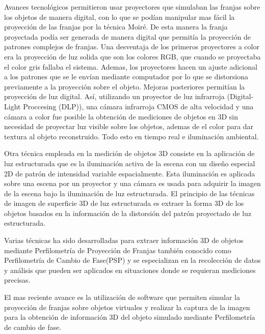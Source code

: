 \documentclass[10pt,letterpaper]{article}
\begin{document}
Avances tecnológicos permitieron usar proyectores que simulaban las franjas sobre los objetos de manera digital, con lo que se podían manipular mas fácil la proyección de las franjas por la técnica Moiré. De esta manera la franja proyectada podía ser generada de manera digital que permitía la proyección de patrones complejos de franjas. Una  desventaja de los primeros proyectores a color era la proyección de luz solida que son los colores RGB, que cuando se proyectaba el color gris fallaba el sistema. Ademas, los proyectores hacen un ajuste adicional a los patrones que se le envían mediante computador por lo que se distorsiona previamente a la proyección sobre el objeto. Mejoras posteriores permitían la proyección de luz digital. Así, utilizando un proyector de luz infrarroja (Digital-Light Proccesing (DLP)), una cámara infrarroja CMOS de alta velocidad y una cámara a color fue posible la obtención de mediciones de objetos en 3D sin necesidad de proyectar luz visible sobre los objetos, ademas de el color para dar textura al objeto reconstruido. Todo esto en tiempo real e iluminación ambiental\cite{Ou:Li}. %

Otra técnica empleada en la medición de objetos 3D consiste en la aplicación de luz estructurada que es la iluminación activa de la escena con un diseño especial 2D de patrón de intensidad variable espacialmente. Esta iluminación es aplicada sobre una escena por un proyector y una cámara es usada para adquirir la imagen de la escena bajo la iluminación de luz estructurada. El principio de las técnicas de imagen de superficie 3D de luz estructurada es extraer la forma 3D de los objetos basados en la información de la distorsión del patrón proyectado de luz estructurada\cite{Jaso:}\cite{Pedr:Rodr}\cite{Lope:Sala}. %

Varias técnicas ha sido desarrolladas para extraer información 3D de objetos mediante Perfilometría de Proyección de Franjas también conocido como Perfilometría de Cambio de Fase(PSP) y se especializan en la recolección de datos y análisis que pueden ser aplicados en situaciones donde se requieran mediciones precisas\cite{Ribb:Jaco}. %

El mas reciente avance es la utilización de software que permiten simular la proyección de franjas sobre objetos virtuales y realizar la captura de la imagen para la obtención de información 3D del objeto simulado mediante Perfilometría de cambio de fase.

\end{document}

